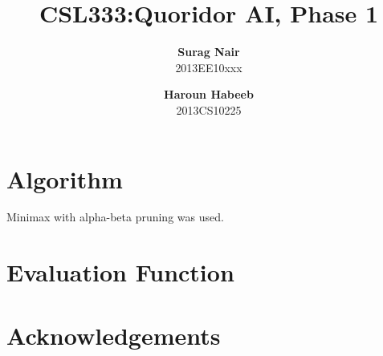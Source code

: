 \documentclass{article}
\begin{document}
\title{ CSL333:Quoridor AI, Phase 1}
\author{\textbf{Surag Nair}\\2013EE10xxx
\and
\textbf{Haroun Habeeb}\\2013CS10225}
\maketitle

\section{Algorithm}
Minimax with alpha-beta pruning was used.

\section{Evaluation Function}

\section{Acknowledgements}
\end{document}

